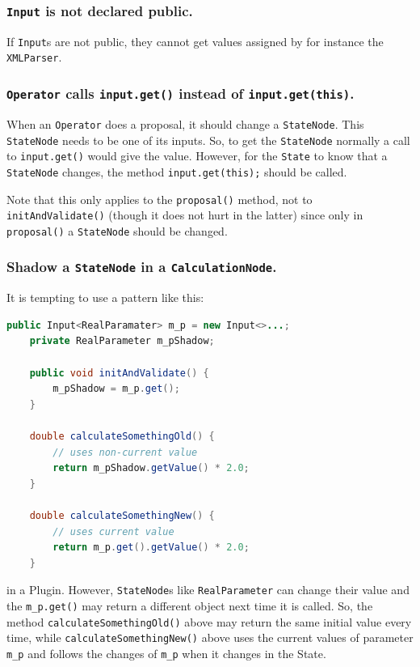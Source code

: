 \documentclass{article}
\begin{document}
\subsubsection{{\tt Input} is not declared public.}

If {\tt Input}s are not public, they cannot get values assigned by for
instance the {\tt XMLParser}.

\subsubsection{{\tt Operator} calls {\tt input.get()} instead of {\tt input.get(this)}.}

When an {\tt Operator} does a proposal, it should change a {\tt StateNode}.
This {\tt StateNode} needs to be one of its inputs. So, to get the {\tt StateNode}
normally a call to {\tt input.get()} would give the value. However, for the
{\tt State} to know that a {\tt StateNode} changes, the method {\tt input.get(this);}
should be called.

Note that this only applies to the {\tt proposal()} method, not to {\tt initAndValidate()}
(though it does not hurt in the latter) since only in {\tt proposal()} a {\tt StateNode}
should be changed.

\subsubsection{Shadow a {\tt StateNode} in a {\tt CalculationNode}.}

It is tempting to use a pattern like this:

{\color{blue}\begin{lstlisting}[language=java]
public Input<RealParamater> m_p = new Input<>...;
    private RealParameter m_pShadow;

    public void initAndValidate() {
        m_pShadow = m_p.get();
    }
    
    double calculateSomethingOld() {
        // uses non-current value
        return m_pShadow.getValue() * 2.0;
    }

    double calculateSomethingNew() {
        // uses current value
        return m_p.get().getValue() * 2.0;
    }
\end{lstlisting}}

in a Plugin. However, {\tt StateNode}s like {\tt RealParameter} can change their
value and the {\tt m\_p.get()} may return a different object next time it is called.
So, the method {\tt calculateSomethingOld()} above may return the same initial value
every time, while {\tt calculateSomethingNew()} above uses the current values of
parameter {\tt m\_p} and follows the changes of {\tt m\_p} when it changes in the State.
\end{document}
